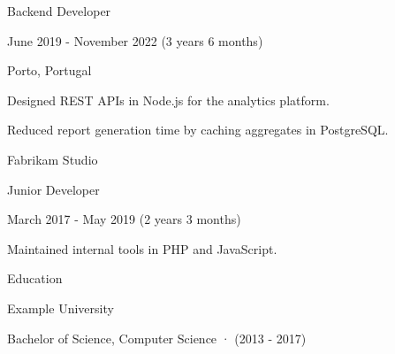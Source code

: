 \documentclass[11pt]{article}
\begin{document}
Backend Developer\par
June 2019 - November 2022 (3 years 6 months)\par
Porto, Portugal\par
Designed REST APIs in Node.js for the analytics platform.\par
Reduced report generation time by caching aggregates in PostgreSQL.\par
\vspace*{\fill}
{\large Fabrikam Studio}\par
Junior Developer\par
\newpage
March 2017 - May 2019 (2 years 3 months)\par
Maintained internal tools in PHP and JavaScript.\par
\vspace{8pt}
{\large Education}\par
{\large Example University}\par
Bachelor of Science, Computer Science · (2013 - 2017)\par
\end{document}
